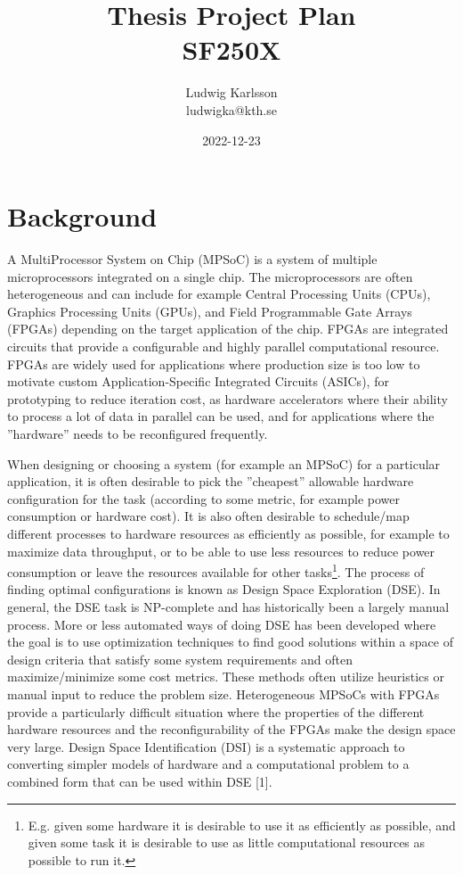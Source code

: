 \documentclass[12pt,notitlepage]{article}
\title{Thesis Project Plan\\SF250X}
\author{Ludwig Karlsson\\ludwigka@kth.se}
\date{2022-12-23}
\begin{document}
\maketitle

\section{Background}
A MultiProcessor System on Chip (MPSoC) is a system of multiple microprocessors integrated on a single chip. The microprocessors are often heterogeneous and can include for example Central Processing Units (CPUs), Graphics Processing Units (GPUs), and Field Programmable Gate Arrays (FPGAs) depending on the target application of the chip. FPGAs are integrated circuits that provide a configurable and highly parallel computational resource. FPGAs are widely used for applications where production size is too low to motivate custom Application-Specific Integrated Circuits (ASICs), for prototyping to reduce iteration cost, as hardware accelerators where their ability to process a lot of data in parallel can be used, and for applications where the ''hardware'' needs to be reconfigured frequently.

When designing or choosing a system (for example an MPSoC) for a particular application, it is often desirable to pick the ''cheapest'' allowable hardware configuration for the task (according to some metric, for example power consumption or hardware cost). It is also often desirable to schedule/map different processes to hardware resources as efficiently as possible, for example to maximize data throughput, or to be able to use less resources to reduce power consumption or leave the resources available for other tasks\footnote{E.g. given some hardware it is desirable to use it as efficiently as possible, and given some task it is desirable to use as little computational resources as possible to run it.}. The process of finding optimal configurations is known as Design Space Exploration (DSE). In general, the DSE task is NP-complete and has historically been a largely manual process. More or less automated ways of doing DSE has been developed where the goal is to use optimization techniques to find good solutions within a space of design criteria that satisfy some system requirements and often maximize/minimize some cost metrics. These methods often utilize heuristics or manual input to reduce the problem size. Heterogeneous MPSoCs with FPGAs provide a particularly difficult situation where the properties of the different hardware resources and the reconfigurability of the FPGAs make the design space very large. Design Space Identification (DSI) is a systematic approach to converting simpler models of hardware and a computational problem to a combined form that can be used within DSE [1].
\end{document}
